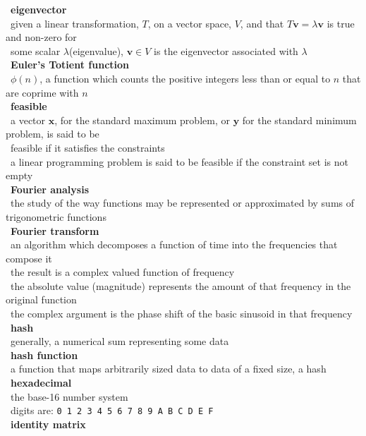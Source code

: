 \documentclass[10pt,letterpaper]{scrartcl}
\newcommand{\tbul}{\textbullet}
\newcommand{\tend}{\>\textendash}
\newcommand{\tasc}{\>\>\textasteriskcentered}
\begin{document}
\begin{tabbing}
\tbul\ \textbf{eigenvector} \\
\tend\ given a linear transformation, $T$, on a vector space, $V$, and that $T\mathbf{v}=\lambda\mathbf{v}$ is true and non-zero for \\ \>\ some scalar $\lambda$(eigenvalue), $\mathbf{v} \in V$ is the eigenvector associated with $\lambda$ \\
\tbul\ \textbf{Euler's Totient function} \\
\tend\ $\phi (n)$, a function which counts the positive integers less than or equal to $n$ that are coprime with $n$\\
\tbul\ \textbf{feasible} \\
\tend\ a vector $\mathbf{x}$, for the standard maximum problem, or $\mathbf{y}$ for the standard minimum problem, is said to be \\ \>\ feasible if it satisfies the constraints \\
\tend\ a linear programming problem is said to be feasible if the constraint set is not empty \\
\tbul\ \textbf{Fourier analysis} \\
\tend\ the study of the way functions may be represented or approximated by sums of trigonometric functions \\
\tbul\ \textbf{Fourier transform} \\
\tend\ an algorithm which decomposes a function of time into the frequencies that compose it \\
\tend\ the result is a complex valued function of frequency \\
\tasc\ the absolute value (magnitude) represents the amount of that frequency in the original function \\
\tasc\ the complex argument is the phase shift of the basic sinusoid in that frequency \\
\tbul\ \textbf{hash} \\
\tend\ generally, a numerical sum representing some data \\
\tbul\ \textbf{hash function} \\
\tend\ a function that maps arbitrarily sized data to data of a fixed size, a hash \\
\tbul\ \textbf{hexadecimal} \\
\tend\ the base-16 number system \\
\tend\ digits are: \texttt{0 1 2 3 4 5 6 7 8 9 A B C D E F} \\
\tbul\ \textbf{identity matrix} \\

\end{tabbing}
\end{document}
